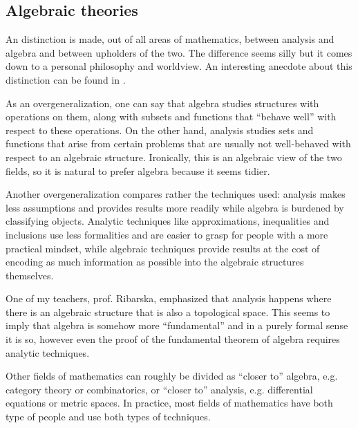 \subsection{Algebraic theories}\label{subsec:algebraic_theories}

\begin{remark}\label{remark:algebra_vs_analysis}
  An distinction is made, out of all areas of mathematics, between analysis and algebra and between upholders of the two. The difference seems silly but it comes down to a personal philosophy and worldview. An interesting anecdote about this distinction can be found in \cite{Tilly2010}.

  As an overgeneralization, one can say that algebra studies structures with operations on them, along with subsets and functions that \enquote{behave well} with respect to these operations. On the other hand, analysis studies sets and functions that arise from certain problems that are usually not well-behaved with respect to an algebraic structure. Ironically, this is an algebraic view of the two fields, so it is natural to prefer algebra because it seems tidier.

  Another overgeneralization compares rather the techniques used: analysis makes less assumptions and provides results more readily while algebra is burdened by classifying objects. Analytic techniques like approximations, inequalities and inclusions use less formalities and are easier to grasp for people with a more practical mindset, while algebraic techniques provide results at the cost of encoding as much information as possible into the algebraic structures themselves.

  One of my teachers, prof. Ribarska, emphasized that analysis happens where there is an algebraic structure that is also a topological space. This seems to imply that algebra is somehow more \enquote{fundamental} and in a purely formal sense it is so, however even the proof of the fundamental theorem of algebra requires analytic techniques.

  Other fields of mathematics can roughly be divided as \enquote{closer to} algebra, e.g. category theory or combinatorics, or \enquote{closer to} analysis, e.g. differential equations or metric spaces. In practice, most fields of mathematics have both type of people and use both types of techniques.
\end{remark}

